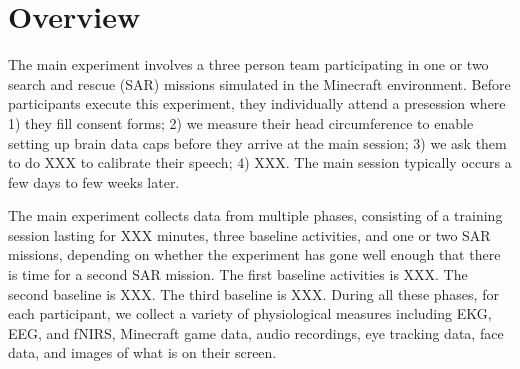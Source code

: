 \section{Overview}

The main experiment involves a three person team participating in one or two
search and rescue (SAR) missions simulated in the Minecraft environment. 
Before participants execute this experiment, they individually attend a
presession where 1) they fill consent forms; 2) we measure their head circumference to enable setting up brain data caps
before they arrive at the main session; 3) we ask them to do XXX to calibrate
their speech; 4) XXX. The main session typically occurs a few days to few weeks
later. 

The main experiment collects data from multiple phases, consisting of a training
session lasting for XXX minutes, three baseline activities, and one or two SAR
missions, depending on whether the experiment has gone well enough that there is
time for a second SAR mission.  The first baseline activities is XXX. The second
baseline is XXX.  The third baseline is XXX.  During all these phases, for each
participant, we collect a variety of physiological measures including EKG, EEG,
and fNIRS, Minecraft game data, audio recordings, eye tracking data, face data,
and images of what is on their screen. 

